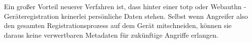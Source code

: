 \begin{itemize}
Ein großer Vorteil neuerer Verfahren ist, dass hinter einer \ac{totp} oder Webauthn - Geräteregistration keinerlei persönliche Daten stehen. Selbst wenn Angreifer also den gesamten Registrationsprozess auf dem Gerät mitschneiden, können sie daraus keine verwertbaren Metadaten für zukünftige Angriffe erlangen.
\end{itemize}
